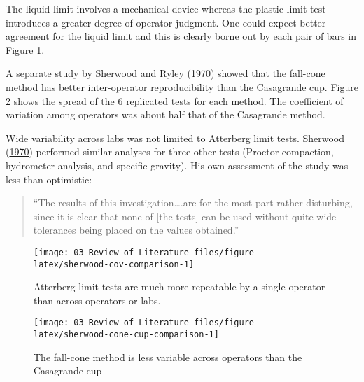 \documentclass[
  letterpaper,
  openany]{book}
\renewenvironment{leftbar}{\def\FrameCommand{\color{grey30}\vrule width 1pt \hspace{10pt}}\MakeFramed {\advance\hsize-\width \FrameRestore}}{\endMakeFramed}
\renewenvironment{quote}%
{\begin{leftbar} \begin{quotation} \noindent \small }%
{\end{quotation}\end{leftbar}}
\begin{document}
The liquid limit involves a mechanical device whereas the plastic limit test introduces a greater degree of operator judgment.
One could expect better agreement for the liquid limit and this is clearly borne out by each pair of bars in Figure \ref{fig:sherwood-cov-comparison}.

A separate study by \protect\hyperlink{ref-Sherwood1970a}{Sherwood and Ryley} (\protect\hyperlink{ref-Sherwood1970a}{1970}) showed that the fall-cone method has better inter-operator reproducibility than the Casagrande cup. Figure \ref{fig:sherwood-cone-cup-comparison} shows the spread of the 6 replicated tests for each method. The coefficient of variation among operators was about half that of the Casagrande method.

Wide variability across labs was not limited to Atterberg limit tests.
\protect\hyperlink{ref-Sherwood1970}{Sherwood} (\protect\hyperlink{ref-Sherwood1970}{1970}) performed similar analyses for three other tests (Proctor compaction, hydrometer analysis, and specific gravity).
His own assessment of the study was less than optimistic:

\begin{quote}
``The results of this investigation\ldots.are for the most part rather disturbing, since it is clear that none of {[}the tests{]} can be used without quite wide tolerances being placed on the values obtained.''
\end{quote}

\begin{figure}

{\centering \texttt{[image: 03-Review-of-Literature\_files/figure-latex/sherwood-cov-comparison-1]} 

}

\caption[COV for Atterberg replicaton types]{Atterberg limit tests are much more repeatable by a single operator than across operators or labs.}\label{fig:sherwood-cov-comparison}
\end{figure}

\begin{figure}

{\centering \texttt{[image: 03-Review-of-Literature\_files/figure-latex/sherwood-cone-cup-comparison-1]} 

}

\caption[Variabilty of fall-cone LL method vs. Casagrande cup]{The fall-cone method is less variable across operators than the Casagrande cup}\label{fig:sherwood-cone-cup-comparison}
\end{figure}
\end{document}
